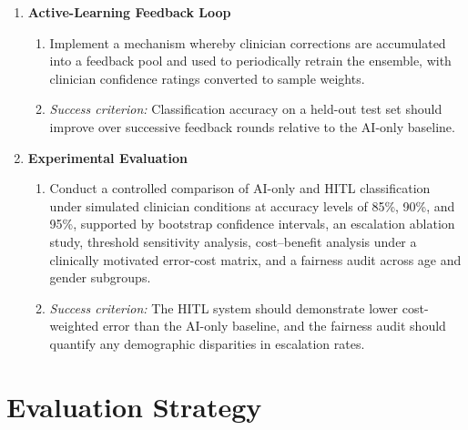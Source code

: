 \documentclass[12pt, a4paper]{report}
\begin{document}
\begin{enumerate}[leftmargin=*, label=\textbf{O\arabic*.}]
    \item \textbf{Active-Learning Feedback Loop}
    \begin{enumerate}[label=(\alph*)]
      \item Implement a mechanism whereby clinician corrections are accumulated into a
      feedback pool and used to periodically retrain the ensemble, with clinician
      confidence ratings converted to sample weights.
      \item \textit{Success criterion:} Classification accuracy on a held-out test set
      should improve over successive feedback rounds relative to the AI-only baseline.
    \end{enumerate}

    \item \textbf{Experimental Evaluation}
    \begin{enumerate}[label=(\alph*)]
      \item Conduct a controlled comparison of AI-only and HITL classification under
      simulated clinician conditions at accuracy levels of 85\%, 90\%, and 95\%,
      supported by bootstrap confidence intervals, an escalation ablation study,
      threshold sensitivity analysis, cost--benefit analysis under a clinically
      motivated error-cost matrix, and a fairness audit across age and gender
      subgroups.
      \item \textit{Success criterion:} The HITL system should demonstrate lower
      cost-weighted error than the AI-only baseline, and the fairness audit should
      quantify any demographic disparities in escalation rates.
    \end{enumerate}

  \end{enumerate}

  \section{Evaluation Strategy}
  \label{sec:evaluation-strategy}
\end{document}
